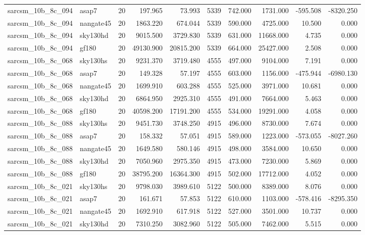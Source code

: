 \begin{longtable}{llrrrrrrrr}
sarcsm\_10b\_8c\_094 & asap7 & 20 & 197.965 & 73.993 & 5339 & 742.000 & 1731.000 & -595.508 & -8320.250 \\
sarcsm\_10b\_8c\_094 & nangate45 & 20 & 1863.220 & 674.044 & 5339 & 590.000 & 4725.000 & 10.500 & 0.000 \\
sarcsm\_10b\_8c\_094 & sky130hd & 20 & 9015.500 & 3729.830 & 5339 & 631.000 & 11668.000 & 4.735 & 0.000 \\
sarcsm\_10b\_8c\_094 & gf180 & 20 & 49130.900 & 20815.200 & 5339 & 664.000 & 25427.000 & 2.508 & 0.000 \\
sarcsm\_10b\_8c\_068 & sky130hs & 20 & 9231.370 & 3719.480 & 4555 & 497.000 & 9104.000 & 7.191 & 0.000 \\
sarcsm\_10b\_8c\_068 & asap7 & 20 & 149.328 & 57.197 & 4555 & 603.000 & 1156.000 & -475.944 & -6980.130 \\
sarcsm\_10b\_8c\_068 & nangate45 & 20 & 1699.910 & 603.288 & 4555 & 525.000 & 3971.000 & 10.681 & 0.000 \\
sarcsm\_10b\_8c\_068 & sky130hd & 20 & 6864.950 & 2925.310 & 4555 & 491.000 & 7664.000 & 5.463 & 0.000 \\
sarcsm\_10b\_8c\_068 & gf180 & 20 & 40598.200 & 17191.200 & 4555 & 534.000 & 19291.000 & 4.058 & 0.000 \\
sarcsm\_10b\_8c\_088 & sky130hs & 20 & 9451.730 & 3748.250 & 4915 & 496.000 & 8730.000 & 7.674 & 0.000 \\
sarcsm\_10b\_8c\_088 & asap7 & 20 & 158.332 & 57.051 & 4915 & 589.000 & 1223.000 & -573.055 & -8027.260 \\
sarcsm\_10b\_8c\_088 & nangate45 & 20 & 1649.580 & 580.146 & 4915 & 498.000 & 3584.000 & 10.650 & 0.000 \\
sarcsm\_10b\_8c\_088 & sky130hd & 20 & 7050.960 & 2975.350 & 4915 & 473.000 & 7230.000 & 5.869 & 0.000 \\
sarcsm\_10b\_8c\_088 & gf180 & 20 & 38795.200 & 16364.300 & 4915 & 502.000 & 17712.000 & 4.052 & 0.000 \\
sarcsm\_10b\_8c\_021 & sky130hs & 20 & 9798.030 & 3989.610 & 5122 & 500.000 & 8389.000 & 8.076 & 0.000 \\
sarcsm\_10b\_8c\_021 & asap7 & 20 & 161.671 & 57.853 & 5122 & 610.000 & 1103.000 & -578.416 & -8295.350 \\
sarcsm\_10b\_8c\_021 & nangate45 & 20 & 1692.910 & 617.918 & 5122 & 527.000 & 3501.000 & 10.737 & 0.000 \\
sarcsm\_10b\_8c\_021 & sky130hd & 20 & 7310.250 & 3082.960 & 5122 & 505.000 & 7462.000 & 5.515 & 0.000 \\

\end{longtable}
